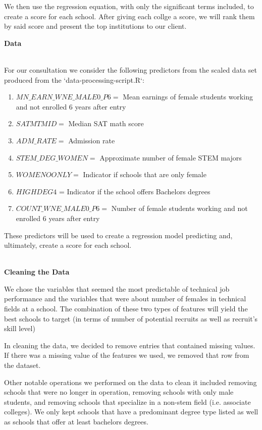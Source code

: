 \documentclass[11pt,english]{article}
\begin{document}
We then use the regression equation, with only the significant terms included, to create a score for each school. After giving each collge a score, we will rank them by said score and present the top institutions to our client.
\vspace*{3\baselineskip}


{\large\textbf{Data}} \\\
              
For our consultation we consider the following predictors from the scaled data set produced from the `data-processing-script.R`:
\begin{enumerate}
\item $ MN\_EARN\_WNE\_MALE0\_P6 =$ Mean earnings of female students working and not enrolled 6 years after entry
\item $ SATMTMID =$ Median SAT math score
\item $ ADM\_RATE =$ Admission rate
\item $ STEM\_DEG\_WOMEN =$ Approximate number of female STEM majors
\item $ WOMENOONLY =$ Indicator if schools that are only female
\item $ HIGHDEG4 $ = Indicator if the school offers Bachelors degrees 
\item $ COUNT\_WNE\_MALE0\_P6 =$ Number of female students working and not enrolled 6 years after entry
\end{enumerate}

These predictors will be used to create a regression model predicting and, ultimately, create a score for each school.\\\

\textbf{Cleaning the Data}

We chose the variables that seemed the most predictable of technical job performance and the variables that were about number of females in technical fields at a school. The combination of these two types of features will yield the best schools to target (in terms of number of potential recruits as well as recruit's skill level)

In cleaning the data, we decided to remove entries that contained missing values. If there was a missing value of the features we used, we removed that row from the dataset. 

Other notable operations we performed on the data to clean it included removing schools that were no longer in operation, removing schools with only male students, and removing schools that specialize in a non-stem field (i.e. associate colleges). We only kept schools that have a predominant degree type listed as well as schools that offer at least bachelors degrees.
\end{document}
